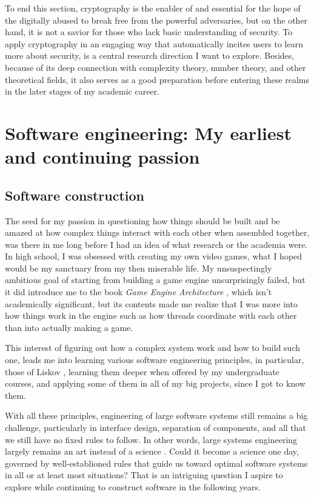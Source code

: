 \documentclass[10pt]{article}
\begin{document}
To end this section, cryptography is the enabler of and essential for the hope
of the digitally abused to break free from the powerful adversaries, but on the
other hand, it is not a savior for those who lack basic understanding of
security. To apply cryptography in an engaging way that automatically incites
users to learn more about security, is a central research direction I want to
explore. Besides, because of its deep connection with complexity theory, number
theory, and other theoretical fields, it also serves as a good preparation
before entering these realms in the later stages of my academic career.

\section[Software engineering]{
Software engineering: My earliest and continuing passion}
\subsection{Software construction}
The seed for my passion in questioning how things should be built and be amazed
at how complex things interact with each other when assembled together, was
there in me long before I had an idea of what research or the academia were. In
high school, I was obsessed with creating my own video games, what I hoped
would be my sanctuary from my then miserable life. My unsuspectingly ambitious
goal of starting from building a game engine unsurprisingly failed, but it did
introduce me to the book \emph{Game Engine Architecture}
\cite{game.engine.arch}, which isn't academically significant, but its contents
made me realize that I was more into how things work in the engine such as how
threads coordinate with each other than into actually making a game.

This interest of figuring out how a complex system work and how to build such
one, leads me into learning various software engineering principles, in
particular, those of Liskov \cite{liskov.adt, liskov.subtype}, learning them
deeper when offered by my undergraduate courses, and applying some of them in
all of my big projects, since I got to know them. 

With all these principles, engineering of large software systems still remains
a big challenge, particularly in interface design, separation of components,
and all that we still have no fixed rules to follow. In other words, large
systems engineering largely remains an art instead of a science
\cite{no.silver.bullet, prospect.eng.discipline.software}. Could it become a
science one day, governed by well-establioned rules that guide us toward
optimal software systems in all or at least most situations? That is an
intriguing question I aspire to explore while continuing to construct software
in the following years.
\end{document}

